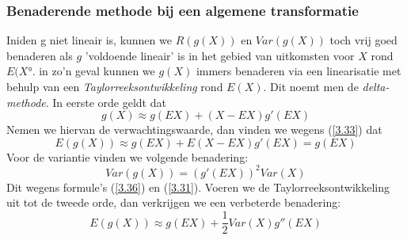 \documentclass[titlepage]{article}
\numberwithin{equation}{section}
\begin{document}
 \subsubsection{Benaderende methode bij een algemene transformatie}
 Iniden g niet lineair is, kunnen we $R(g(X))$ en $Var(g(X))$ toch vrij goed benaderen als $g$ 'voldoende lineair' is in het gebied van uitkomsten voor $X$ rond $E(X°$. in zo'n geval kunnen we $g(X)$ immers benaderen via een linearisatie met behulp van een \textit{Taylorreeksontwikkeling} rond $E(X)$. Dit noemt men de \textit{delta-methode}.\newline
 In eerste orde geldt dat
 \begin{equation}
 	g(X) \approx g(EX) + (X-EX)g'(EX)
 	\label{3.43}
 \end{equation}
 Nemen we hiervan de verwachtingswaarde, dan vinden we wegens (\ref{3.33}) dat
 \begin{equation}
 	E(g(X)) \approx g(EX) + E(X-EX) g'(EX) = g(EX)
 	\label{3.44}
 \end{equation}
 Voor de variantie vinden we volgende benadering:
 \begin{equation}
 	Var(g(X)) = (g'(EX))^2 Var(X)
 	\label{3.45}
 \end{equation}
 Dit wegens formule's (\ref{3.36}) en (\ref{3.31}).\newline
 Voeren we de Taylorreeksontwikkeling uit tot de tweede orde, dan verkrijgen we een verbeterde benadering:
 \begin{equation}
 	E(g(X)) \approx g(EX) + \frac{1}{2} Var(X) g''(EX)
 	\label{3.46}
 \end{equation}
\end{document}

